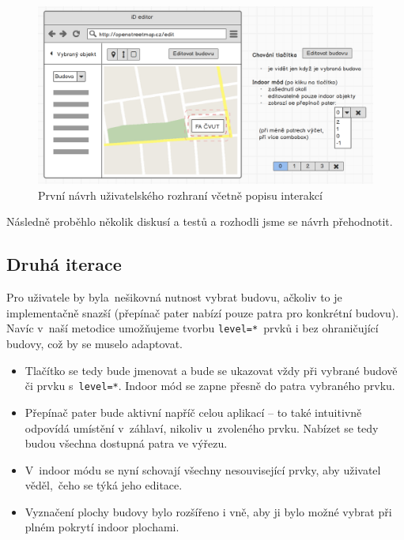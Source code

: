 \begin{figure}
	  \centering
      \includegraphics[width=\textwidth]{img/32-id-navrh-ui-1.png}
      \caption{První návrh uživatelského rozhraní včetně popisu interakcí}
      \label{obr32}
  \end{figure}

Následně proběhlo několik diskusí a testů a rozhodli jsme se návrh přehodnotit.

\subsection{Druhá iterace}\label{druhuxe1-iterace}

Pro uživatele by byla~nešikovná nutnost vybrat budovu, ačkoliv to je implementačně snazší (přepínač pater nabízí pouze patra pro konkrétní budovu). Navíc v~naší metodice umožňujeme tvorbu \texttt{level=*}~prvků i bez ohraničující budovy, což by se muselo adaptovat.

\begin{itemize}

\item
  Tlačítko se tedy bude jmenovat  a bude se ukazovat vždy při vybrané budově či prvku s~\texttt{level=*}. Indoor mód se zapne přesně do patra vybraného prvku.
\item
  Přepínač pater bude aktivní napříč celou aplikací -- to také intuitivně odpovídá umístění v~záhlaví, nikoliv u~zvoleného prvku. Nabízet se tedy budou všechna dostupná patra ve výřezu.
\item
  V~indoor módu se nyní schovají všechny nesouvisející prvky, aby uživatel věděl,~čeho se týká jeho editace.
\item
  Vyznačení plochy budovy bylo rozšířeno i vně, aby ji bylo možné vybrat při plném pokrytí indoor plochami.
\end{itemize}

